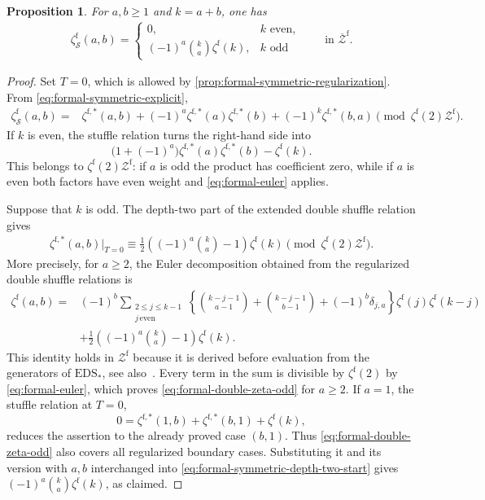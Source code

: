 \documentclass[12pt]{amsart}
\numberwithin{equation}{section}
\theoremstyle{plain}
\newtheorem{prop}[prop]{Proposition}
\newcommand{\Zf}{{\mathcal Z^{\mathrm f}}}
\newcommand{\Zbarf}{{\overline{\mathcal Z}^{\mathrm f}}}
\newcommand{\zf}[1]{\zeta^{\mathrm f}(#1)}
\newcommand{\zsf}[1]{\zeta_{\mathcal S}^{\mathrm f}(#1)}
\begin{document}
\begin{prop}\label{prop:formal-symmetric-depth-two}
For $a,b\geq1$ and $k=a+b$, one has
\begin{align}\label{eq:formal-symmetric-depth-two}
 \zsf{a,b}=
 \begin{cases}
  0,&k\text{ even},\\
  (-1)^a\binom{k}{a}\zf{k},&k\text{ odd}
 \end{cases}
 \qquad\text{in }\Zbarf.
\end{align}
\end{prop}

\begin{proof}
Set $T=0$, which is allowed by \cref{prop:formal-symmetric-regularization}. From \eqref{eq:formal-symmetric-explicit},
\begin{align}\label{eq:formal-symmetric-depth-two-start}
 \zsf{a,b}
 ={}&\zeta^{\mathrm f,*}(a,b)
 +(-1)^a\zeta^{\mathrm f,*}(a)\zeta^{\mathrm f,*}(b)
 +(-1)^k\zeta^{\mathrm f,*}(b,a)
 \pmod{\zf{2}\Zf}.
\end{align}
If $k$ is even, the stuffle relation turns the right-hand side into
\[
 \bigl(1+(-1)^a\bigr)\zeta^{\mathrm f,*}(a)
 \zeta^{\mathrm f,*}(b)-\zf{k}.
\]
This belongs to $\zf{2}\Zf$: if $a$ is odd the product has coefficient zero, while if $a$ is even both factors have even weight and \eqref{eq:formal-euler} applies.

Suppose that $k$ is odd. The depth-two part of the extended double shuffle relation gives
\begin{align}\label{eq:formal-double-zeta-odd}
 \zeta^{\mathrm f,*}(a,b)\big|_{T=0}
 \equiv\frac12\left((-1)^a\binom{k}{a}-1\right)\zf{k}
 \pmod{\zf{2}\Zf}.
\end{align}
More precisely, for $a\geq2$, the Euler decomposition obtained from the regularized double shuffle relations is
\begin{align*}
 \zf{a,b}={}&(-1)^b
 \sum_{\substack{2\leq j\leq k-1\\j\,\mathrm{even}}}
 \left\{\binom{k-j-1}{a-1}+\binom{k-j-1}{b-1}
       +(-1)^b\delta_{j,a}\right\}\zf{j}\zf{k-j}\\
 &+\frac12\left((-1)^a\binom{k}{a}-1\right)\zf{k}.
\end{align*}
This identity holds in $\Zf$ because it is derived before evaluation from the generators of $\mathrm{EDS}_*$, see also~\cite[Section~2.2]{BIM}. Every term in the sum is divisible by $\zf{2}$ by \eqref{eq:formal-euler}, which proves \eqref{eq:formal-double-zeta-odd} for $a\geq2$. If $a=1$, the stuffle relation at $T=0$,
\[
 0=\zeta^{\mathrm f,*}(1,b)+\zeta^{\mathrm f,*}(b,1)+\zf{k},
\]
reduces the assertion to the already proved case $(b,1)$. Thus \eqref{eq:formal-double-zeta-odd} also covers all regularized boundary cases. Substituting it and its version with $a,b$ interchanged into \eqref{eq:formal-symmetric-depth-two-start} gives
$(-1)^a\binom{k}{a}\zf{k}$, as claimed.
\end{proof}
\end{document}
